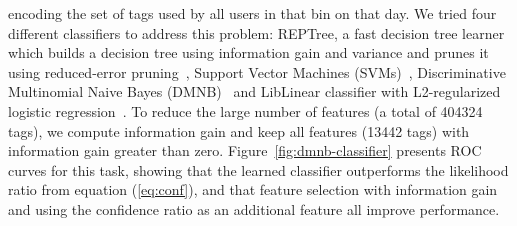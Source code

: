 encoding the set of tags used by all users in that bin on that
day.
We tried four different classifiers to address this problem: REPTree,
a fast decision tree learner which builds a decision tree using
information gain and variance and prunes it using reduced-error
pruning~\cite{hall2009weka}, Support Vector Machines
(SVMs)~\cite{CC01a}, Discriminative Multinomial Naive Bayes
(DMNB)~\cite{su2008discriminative} and LibLinear classifier with
L2-regularized logistic regression~\cite{Fan2008}.  To
reduce the large number of features (a total
of 404324 tags), we compute information gain and keep all
features (13442 tags) with information gain greater than
zero. 
%
%
%
%
%
Figure~\ref{fig:dmnb-classifier} presents ROC curves for this task, 
showing that the learned classifier outperforms the likelihood ratio from equation (\ref{eq:conf}), and that
feature selection with information gain and using the confidence ratio as an additional feature all improve performance.

